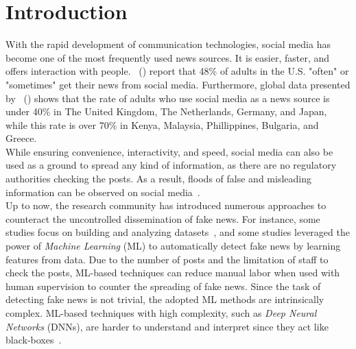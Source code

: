 
\chapter{Introduction}\label{chapter:introduction}

With the rapid development of communication technologies, social media has become one of the most frequently used news sources. It is easier, faster, and offers interaction with people.~\citeauthor{NewsConsumptionAcrossSocialMedia_pewresearch} (\citeyear{NewsConsumptionAcrossSocialMedia_pewresearch}) report that 48\% of adults in the U.S. "often" or "sometimes" get their news from social media. Furthermore, global data presented by~\citeauthor{StatistaUsageOfSocialMedia_Watson} (\citeyear{StatistaUsageOfSocialMedia_Watson}) shows that the rate of adults who use social media as a news source is under 40\% in The United Kingdom, The Netherlands, Germany, and Japan, while this rate is over 70\% in Kenya, Malaysia, Phillippines, Bulgaria, and Greece.\\
While ensuring convenience, interactivity, and speed, social media can also be used as a ground to spread any kind
of information, as there are no regulatory authorities checking the posts. As a result, floods of false and misleading information can be observed on social media~\parencite{SocialMediaAndFakeNewsIn2016Election_Allcott}.\\
Up to now, the research community has introduced numerous approaches to counteract the uncontrolled dissemination of fake news. For instance, some studies focus on building and analyzing datasets~\parencite{FakeNewsDetectionOnSocialMediaADataMiningPerspective_Shu, LiarLiarPantsOnFire_Wang, FakeReddit_Nakamura, SomeLikeItHoaxDataset_Tacchini, BuzzfaceDataset_Santia, UPFD_Dataset_Shu}, and some studies leveraged the power of \emph{Machine Learning} (ML) to automatically detect fake news by learning features from data. Due to the number of posts and the limitation of staff to check the posts, ML-based techniques can reduce manual labor when used with human supervision to counter the spreading of fake news. Since the task of detecting fake news is not trivial, the adopted ML methods are intrinsically complex. ML-based techniques with high complexity, such as \emph{Deep Neural Networks} (DNNs), are harder to understand and interpret since they act like black-boxes~\parencite{CanWeOpenTheBlackBoxOfAI_Castelvecchi}.\\

